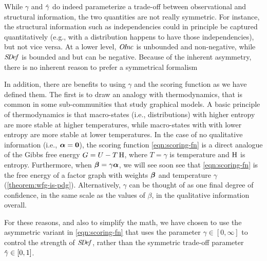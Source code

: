 While $\gamma$ and $\zogamma$ do indeed parameterize a trade-off between observational and structural information, the two quantities are not really symmetric.
For instance, the structural information such as independencies could in principle be captured quantitatively (e.g., with a distribution happens to have those independencies), but not vice versa. 
At a lower level, $\mathit{O\mskip-2.5muI\mskip-3.5mun\mskip-1.7muc}$ is unbounded and non-negative, while $\mathit{S\mskip-3.5muD\mskip-2.5mue\mskip-1.5muf}$ is bounded and but can be negative. 
Because of the inherent asymmetry, 
    there is no inherent reason to prefer
    a symmetrical formalism

In addition, there are benefits to using $\gamma$ and the scoring function as we have defined them. 
The first is to draw an analogy with thermodynamics, that is 
    common in some sub-communities that study graphical models.
A basic principle of thermodynamics is that
    macro-states (i.e., distributions) with higher entropy are more stable at higher temperatures, while macro-states with with lower entropy are more stable at lower temperatures.
In the case of no qualitative information (i.e., $\boldsymbol\alpha = \mathbf 0$),
    the scoring function \eqref{eqn:scoring-fn}
    is a direct analogue of the Gibbs free energy $G = U - T \operatorname{\mathrm{H}}$,
    where $T = \gamma$ is temperature and $\operatorname{\mathrm{H}}$ is entropy. 
Furthermore, when $\boldsymbol\beta = \gamma \boldsymbol\alpha$,
    we will see soon see that \eqref{eqn:scoring-fn} is the free energy
    of a factor graph with weights $\boldsymbol\beta$ and temperature $\gamma$
    (\cref{theorem:wfg-is-pdg}).
Alternatively, $\gamma$ can be thought of as one final degree of confidence, in the same scale as the values of $\beta$, in the qualitative information overall.

For these reasons, and also to simplify the math, we have chosen to use the asymmetric variant in \eqref{eqn:scoring-fn} that uses the parameter $\gamma \in [0,\infty]$ to control the strength of $\mathit{S\mskip-3.5muD\mskip-2.5mue\mskip-1.5muf}$, rather than the symmetric trade-off parameter $\zogamma \in [0,1]$.

